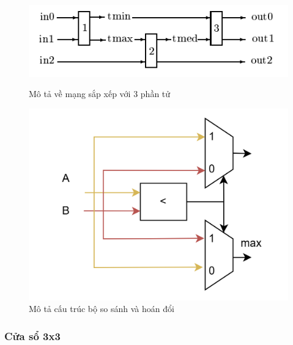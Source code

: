 \begin{figure}[!ht]
	\centering
	\begin{minipage}[b]{0.48\linewidth}
		\centering
		\includegraphics[width=\linewidth]{figures/sortingEx3.png}
		\caption{Mô tả về mạng sắp xếp với 3 phần tử \cite{altivec}}
		\label{fig:sortingEx3}
	\end{minipage}
	\hfill
	\begin{minipage}[b]{0.48\linewidth}
		\centering
		\includegraphics[width=\linewidth]{figures/node.png}
		\caption{Mô tả cấu trúc bộ so sánh và hoán đổi}
		\label{fig:node}
	\end{minipage}
\end{figure}
\subsubsection{Cửa sổ 3x3}

